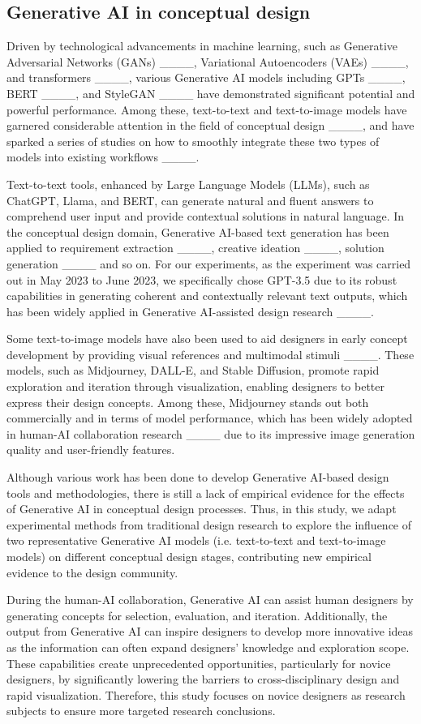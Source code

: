 \subsection{Generative AI in conceptual design}
Driven by technological advancements in machine learning, such as Generative Adversarial Networks (GANs) ____, Variational Autoencoders (VAEs) ____, and transformers ____, various Generative AI models including GPTs ____, BERT ____, and StyleGAN ____ have demonstrated significant potential and powerful performance. Among these, text-to-text and text-to-image models have garnered considerable attention in the field of conceptual design ____, and have sparked a series of studies on how to smoothly integrate these two types of models into existing workflows ____. 

Text-to-text tools, enhanced by Large Language Models (LLMs), such as ChatGPT, Llama, and BERT, can generate natural and fluent answers to comprehend user input and provide contextual solutions in natural language. In the conceptual design domain, Generative AI-based text generation has been applied to requirement extraction ____, creative ideation ____, solution generation ____ and so on. For our experiments, as the experiment was carried out in May 2023 to June 2023, we specifically chose GPT-3.5 due to its robust capabilities in generating coherent and contextually relevant text outputs, which has been widely applied in Generative AI-assisted design research ____. 

Some text-to-image models have also been used to aid designers in early concept development by providing visual references and multimodal stimuli ____. These models, such as Midjourney, DALL-E, and Stable Diffusion, promote rapid exploration and iteration through visualization, enabling designers to better express their design concepts. Among these, Midjourney stands out both commercially and in terms of model performance, which has been widely adopted in human-AI collaboration research ____ due to its impressive image generation quality and user-friendly features.

Although various work has been done to develop Generative AI-based design tools and methodologies, there is still a lack of empirical evidence for the effects of Generative AI in conceptual design processes. Thus, in this study, we adapt experimental methods from traditional design research to explore the influence of two representative Generative AI models (i.e. text-to-text and text-to-image models) on different conceptual design stages, contributing new empirical evidence to the design community. 

During the human-AI collaboration, Generative AI can assist human designers by generating concepts for selection, evaluation, and iteration. Additionally, the output from Generative AI can inspire designers to develop more innovative ideas as the information can often expand designers’ knowledge and exploration scope. These capabilities create unprecedented opportunities, particularly for novice designers, by significantly lowering the barriers to cross-disciplinary design and rapid visualization. Therefore, this study focuses on novice designers as research subjects to ensure more targeted research conclusions.